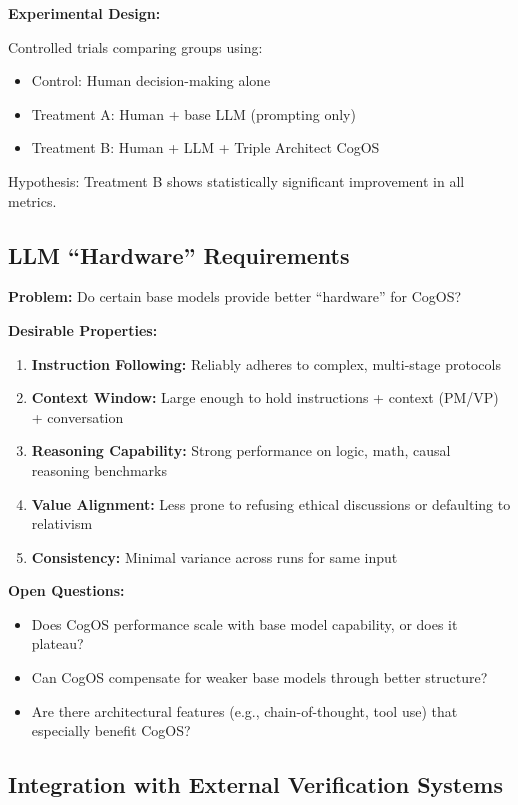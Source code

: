 \documentclass[11pt,a4paper]{article}
\theoremstyle{definition}
\theoremstyle{remark}
\begin{document}
\textbf{Experimental Design:}

Controlled trials comparing groups using:
\begin{itemize}
    \item Control: Human decision-making alone
    \item Treatment A: Human + base LLM (prompting only)
    \item Treatment B: Human + LLM + Triple Architect CogOS
\end{itemize}

Hypothesis: Treatment B shows statistically significant improvement in all metrics.

\subsection{LLM ``Hardware'' Requirements}

\textbf{Problem:} Do certain base models provide better ``hardware'' for CogOS?

\textbf{Desirable Properties:}
\begin{enumerate}
    \item \textbf{Instruction Following:} Reliably adheres to complex, multi-stage protocols
    \item \textbf{Context Window:} Large enough to hold instructions + context (PM/VP) + conversation
    \item \textbf{Reasoning Capability:} Strong performance on logic, math, causal reasoning benchmarks
    \item \textbf{Value Alignment:} Less prone to refusing ethical discussions or defaulting to relativism
    \item \textbf{Consistency:} Minimal variance across runs for same input
\end{enumerate}

\textbf{Open Questions:}
\begin{itemize}
    \item Does CogOS performance scale with base model capability, or does it plateau?
    \item Can CogOS compensate for weaker base models through better structure?
    \item Are there architectural features (e.g., chain-of-thought, tool use) that especially benefit CogOS?
\end{itemize}

\subsection{Integration with External Verification Systems}
\end{document}
